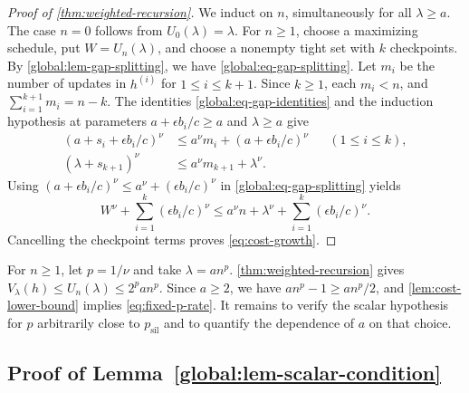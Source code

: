 \documentclass[11pt,letterpaper]{article}
\theoremstyle{definition}
\newcommand{\psil}{p_{\mathrm{sil}}}
\begin{document}
\begin{proof}[Proof of \cref{thm:weighted-recursion}]
We induct on $n$, simultaneously for all $\lambda\ge a$.
The case $n=0$ follows from $U_0(\lambda)=\lambda$.
For $n\ge1$, choose a maximizing schedule, put $W=U_n(\lambda)$, and choose a nonempty tight set with $k$ checkpoints.
By \cref{global:lem-gap-splitting}, we have \eqref{global:eq-gap-splitting}.
Let $m_i$ be the number of updates in $h^{(i)}$ for $1\le i\le k+1$.
Since $k\ge1$, each $m_i<n$, and $\sum_{i=1}^{k+1}m_i=n-k$.
The identities \eqref{global:eq-gap-identities} and the induction hypothesis at parameters $a+\epsilon b_i/c\ge a$ and $\lambda\ge a$ give
\begin{equation*}
\begin{aligned}
  (a+s_i+\epsilon b_i/c)^\nu&\le a^\nu m_i+(a+\epsilon b_i/c)^\nu
      &&(1\le i\le k),\\
  (\lambda+s_{k+1})^\nu&\le a^\nu m_{k+1}+\lambda^\nu.
\end{aligned}
\end{equation*}
Using $(a+\epsilon b_i/c)^\nu\le a^\nu+(\epsilon b_i/c)^\nu$ in \eqref{global:eq-gap-splitting} yields
\[
  W^\nu+\sum_{i=1}^k(\epsilon b_i/c)^\nu
  \le a^\nu n+\lambda^\nu+\sum_{i=1}^k(\epsilon b_i/c)^\nu.
\]
Cancelling the checkpoint terms proves \eqref{eq:cost-growth}.
\end{proof}

For $n\ge1$, let $p=1/\nu$ and take $\lambda=an^p$.
\cref{thm:weighted-recursion} gives $V_\lambda(h)\le U_n(\lambda)\le 2^p a n^p$.
Since $a\ge2$, we have $an^p-1\ge an^p/2$, and \cref{lem:cost-lower-bound} implies \eqref{eq:fixed-p-rate}.
It remains to verify the scalar hypothesis for $p$ arbitrarily close to $\psil$ and to quantify the dependence of $a$ on that choice.

\subsection{Proof of Lemma~\ref{global:lem-scalar-condition}}
\label{global:app-scalar}
\end{document}
